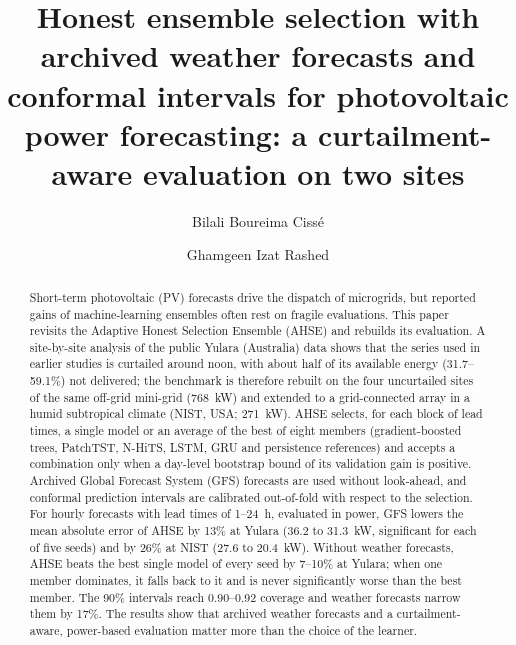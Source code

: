 \documentclass[preprint,12pt]{elsarticle}
\begin{document}
\begin{frontmatter}

\title{Honest ensemble selection with archived weather forecasts and
       conformal intervals for photovoltaic power forecasting:
       a curtailment-aware evaluation on two sites}

\author[1,2]{Bilali Boureima Cissé}

\author[1,2]{Ghamgeen Izat Rashed}



\begin{abstract}
Short-term photovoltaic (PV) forecasts drive the dispatch of microgrids, but reported gains of
machine-learning ensembles often rest on fragile evaluations. This paper revisits the Adaptive
Honest Selection Ensemble (AHSE) and rebuilds its evaluation. A site-by-site analysis of the
public Yulara (Australia) data shows that the series used in earlier studies is curtailed around
noon, with about half of its available energy (31.7--59.1\%) not delivered; the benchmark is
therefore rebuilt on the four uncurtailed sites of the same off-grid mini-grid (768~kW) and
extended to a grid-connected array in a humid subtropical climate (NIST, USA; 271~kW). AHSE
selects, for each block of lead times, a single model or an average of the best of eight
members (gradient-boosted trees, PatchTST, N-HiTS, LSTM, GRU and persistence references) and
accepts a combination only when a day-level bootstrap bound of its validation gain is positive.
Archived Global Forecast System (GFS) forecasts are used without look-ahead, and conformal
prediction intervals are calibrated out-of-fold with respect to the selection. For hourly
forecasts with lead times of 1--24~h, evaluated in power, GFS lowers the mean absolute error of
AHSE by 13\% at Yulara (36.2 to 31.3~kW, significant for each of five seeds) and by 26\% at NIST
(27.6 to 20.4~kW). Without weather forecasts, AHSE beats the best single model of every seed by
7--10\% at Yulara; when one member dominates, it falls back to it and is never significantly
worse than the best member. The 90\% intervals reach 0.90--0.92 coverage and weather forecasts
narrow them by 17\%. The results show that archived weather forecasts and a curtailment-aware,
power-based evaluation matter more than the choice of the learner.
\end{abstract}


\end{frontmatter}
\end{document}
